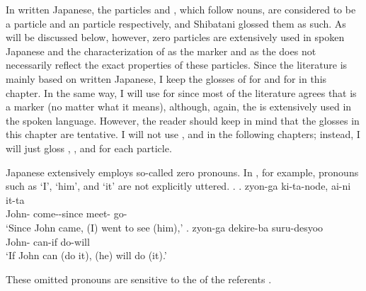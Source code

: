 In written Japanese, the particles  and , which follow nouns, are considered to be a  particle and an  particle respectively,
and Shibatani glossed them as such.
As will be discussed below, however,
zero particles are extensively used in spoken Japanese and
the characterization of  as the  marker and  as the  does not necessarily reflect the exact properties of these particles.
Since the literature is mainly based on written Japanese,
I keep the glosses of  for  and  for  in this chapter.
In the same way, I will use  for  since most of the literature agrees that  is a  marker (no matter what it means),
although, again, the  is extensively used in the spoken language.
However, the reader should keep in mind that the glosses in this chapter are tentative.
I will not use  , and  in the following chapters;
instead, I will just gloss , , and  for each particle.

Japanese extensively employs so-called zero pronouns.
In \Next, for example,
pronouns such as `I', `him', and `it' are not explicitly uttered.
%
\ex.
 \ag. zyon-ga ki-ta-node, ai-ni it-ta \\
      John- come--since meet- go- \\
      `Since John came, (I) went to see (him),'
 \bg. zyon-ga dekire-ba suru-desyoo \\
      John- can-if do-will \\
      `If John can (do it), (he) will do (it).'
      \hfill{\cite[17]{kuno73}}

These omitted pronouns are sensitive to the  of the referents \cite[see][Chapter 1]{kuno78}.


